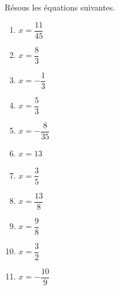 \documentclass[12pt,parskip=half-, twoside=semi]{scrartcl}
\begin{document}
\begin{exercise}
    Résous les équations suivantes.
      \begin{enumerate}[itemsep=0.4cm]
        \item $x=\dfrac{11}{45}$
        \item $x=\dfrac{8}{3}$
        \item $x=-\dfrac{1}{3}$
        \item $x=\dfrac{5}{3}$
        \item $x=-\dfrac{8}{35}$
        \item $x=13$
        \item $x=\dfrac{3}{5}$
        \item $x=\dfrac{13}{8}$
        \item $x=\dfrac{9}{8}$
        \item $x=\dfrac{3}{2}$
        \item $x=-\dfrac{10}{9}$
    \end{enumerate}
\end{exercise}
\end{document}
